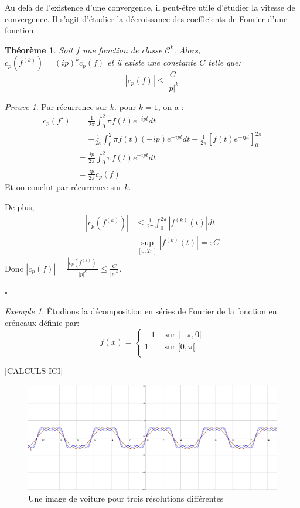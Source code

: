 \documentclass[]{article}
\newtheorem{mythm}{Théorème}
\theoremstyle{remark}
\newtheorem{myproof}{Preuve}
\newtheorem{myexmpl}{Exemple}
\theoremstyle{definition}
\newcommand{\cqfd}{
	\hfill$\square$
}
\newcommand{\DS}{\displaystyle}
\begin{document}
	
			
	Au delà de l'existence d'une convergence, il peut-être utile d'étudier la vitesse de convergence. Il s'agit d'étudier la décroissance des coefficients de Fourier d'une fonction. 
	
	\begin{mythm}
		Soit $f$ une fonction de classe $\mathcal{C}^k$. Alors, $c_p(f^{(k)}) = (ip)^kc_p(f)$ et il existe une constante $C$ telle que:
			$$ | c_p(f) | \leqslant \frac{C}{|p|^k} $$
	\end{mythm}
	
	\begin{myproof}
		Par récurrence sur $k$. 
		pour $k=1$, on a :
			\begin{align*}
			c_p(f') &= \frac{1}{2\pi}\int_0^2\pi f(t)e^{-ipt}dt \\
					&= -\frac{1}{2\pi}\int_0^2\pi f(t)(-ip) e^{-ipt}dt + \frac{1}{2\pi}\left[f(t)e^{-ipt} \right]_0^{2\pi} \\
					& = \frac {ip}{2\pi} \int_0^2\pi f(t)e^{-ipt}dt \\
					& = \frac {ip}{2\pi} c_p(f)
			\end{align*}
			Et on conclut par récurrence sur $k$.
		
		De plus, 
		\begin{align*}
		|c_p(f^{(k)})| &\leqslant \frac{1}{2\pi}\int_0^{2\pi}|f^{(k)}(t)|dt \\
		& \sup_{[0, 2\pi]} |f^{(k)}(t)| =: C 
		\end{align*}
		Donc $ \DS|c_p(f)| = \frac {|c_p(f^{(k)})|}{|p|^k} \leqslant \frac{C}{|p|^k} $.
		\cqfd		
	\end{myproof}
		
	
	\newpage
	
	\begin{myexmpl}
		Étudions la décomposition en séries de Fourier de la fonction en créneaux définie par: 
		$$ f(x) = \left\{
		\begin{array}{cc}
			-1 & \text{ sur }[-\pi, 0[ \\
			1 & \text{ sur }[0, \pi[ \\
		\end{array}
		\right. $$
	
	[CALCULS ICI]
	
	\begin{figure}[h]
		\centering
		\includegraphics[width=350pt]{Signal_carre_fourier.png}
		\caption{Une image de voiture pour trois résolutions différentes}
	\end{figure}
	
	\end{myexmpl}
	
\end{document}
